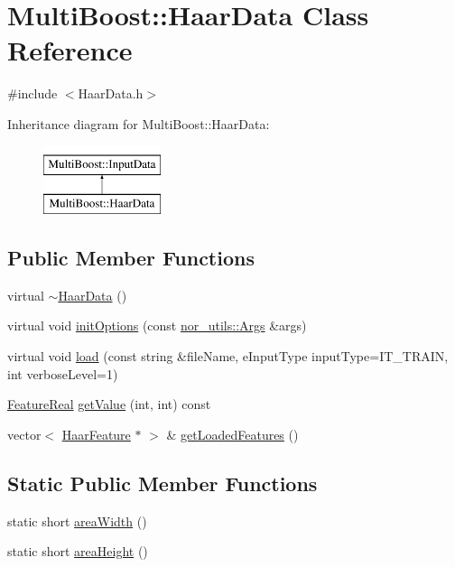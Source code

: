 \hypertarget{classMultiBoost_1_1HaarData}{\section{Multi\-Boost\-:\-:Haar\-Data Class Reference}
\label{classMultiBoost_1_1HaarData}
}


{\ttfamily \#include $<$Haar\-Data.\-h$>$}

Inheritance diagram for Multi\-Boost\-:\-:Haar\-Data\-:\begin{figure}[H]
\begin{center}
\leavevmode
\includegraphics[height=2.000000cm]{classMultiBoost_1_1HaarData}
\end{center}
\end{figure}
\subsection*{Public Member Functions}
\begin{DoxyCompactItemize}
\item 
virtual \hyperlink{classMultiBoost_1_1HaarData_ad8e370648f3ee73362be0a7de7c3c1b6}{$\sim$\-Haar\-Data} ()
\item 
virtual void \hyperlink{classMultiBoost_1_1HaarData_a3b37aff7853230f715ab0ad62610ddbb}{init\-Options} (const \hyperlink{classnor__utils_1_1Args}{nor\-\_\-utils\-::\-Args} \&args)
\item 
virtual void \hyperlink{classMultiBoost_1_1HaarData_af48d9ca35effea8c6f653b66cfc81b71}{load} (const string \&file\-Name, e\-Input\-Type input\-Type=I\-T\-\_\-\-T\-R\-A\-I\-N, int verbose\-Level=1)
\item 
\hyperlink{Defaults_8h_a3a11cfe6a5d469d921716ca6291e934f}{Feature\-Real} \hyperlink{classMultiBoost_1_1HaarData_a22f4952fb0f6bc1a5b6c599a24456576}{get\-Value} (int, int) const 
\item 
vector$<$ \hyperlink{classMultiBoost_1_1HaarFeature}{Haar\-Feature} $\ast$ $>$ \& \hyperlink{classMultiBoost_1_1HaarData_a74f63b1f14a4c1b7d8901ad431dddb78}{get\-Loaded\-Features} ()
\end{DoxyCompactItemize}
\subsection*{Static Public Member Functions}
\begin{DoxyCompactItemize}
\item 
static short \hyperlink{classMultiBoost_1_1HaarData_a8a127852e10666e85dd4d013466c928e}{area\-Width} ()
\item 
static short \hyperlink{classMultiBoost_1_1HaarData_a86ae8e41a9e33317337b2450e9609389}{area\-Height} ()
\end{DoxyCompactItemize}
